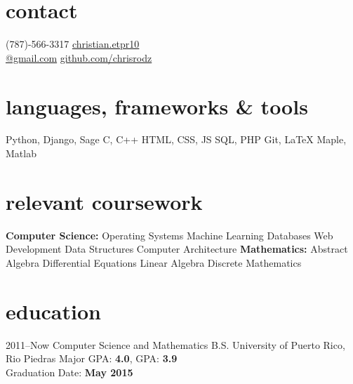 \documentclass[]{friggeri-cv}
\begin{document}


\begin{aside} %
\section{contact}
(787)-566-3317
\href{mailto:christian.etpr10@gmail.com}{christian.etpr10 \\ @gmail.com}
\href{http://github.com/chrisrodz}{github.com/chrisrodz}
\section{languages, frameworks \& tools}
Python, Django, Sage
C, C++
HTML, CSS, JS
SQL, PHP
Git, LaTeX
Maple, Matlab
\section{relevant coursework}
\vspace{1em} \textbf{Computer Science:}
Operating Systems
Machine Learning
Databases
Web Development
Data Structures 
Computer Architecture\vspace{1em}
\textbf{Mathematics:}
Abstract Algebra
Differential Equations
Linear Algebra
Discrete Mathematics
\end{aside}


\section{education}

\begin{entrylist}
\entry
{2011--Now}
{Computer Science and Mathematics B.S.}
{University of Puerto Rico, Rio Piedras}
{Major GPA: \textbf{4.0}, GPA: \textbf{3.9} \\ Graduation Date: \textbf{May 2015}}
\end{entrylist}
\end{document}
